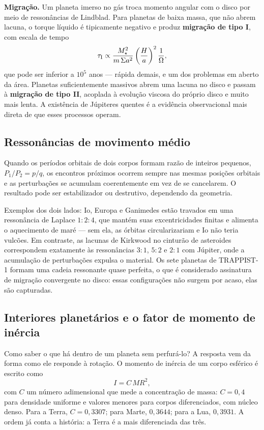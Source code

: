\documentclass[11pt,a4paper]{article}
\begin{document}
\textbf{Migração.} Um planeta imerso no gás troca momento angular com o disco por meio de ressonâncias de Lindblad. Para planetas de baixa massa, que não abrem lacuna, o torque líquido é tipicamente negativo e produz \textbf{migração de tipo I}, com escala de tempo
\[
\tau_{\rm I}\propto\frac{M_\star^{2}}{m\,\Sigma a^{2}}\left(\frac{H}{a}\right)^{2}\frac{1}{\Omega},
\]
que pode ser inferior a $10^{5}$ anos --- rápida demais, e um dos problemas em aberto da área. Planetas suficientemente massivos abrem uma lacuna no disco e passam à \textbf{migração de tipo II}, acoplada à evolução viscosa do próprio disco e muito mais lenta. A existência de Júpiteres quentes é a evidência observacional mais direta de que esses processos operam.

\subsection*{Ressonâncias de movimento médio}

Quando os períodos orbitais de dois corpos formam razão de inteiros pequenos, $P_1/P_2=p/q$, os encontros próximos ocorrem sempre nas mesmas posições orbitais e as perturbações se acumulam coerentemente em vez de se cancelarem. O resultado pode ser estabilizador ou destrutivo, dependendo da geometria.

Exemplos dos dois lados: Io, Europa e Ganimedes estão travados em uma ressonância de Laplace $1:2:4$, que mantém suas excentricidades finitas e alimenta o aquecimento de maré --- sem ela, as órbitas circularizariam e Io não teria vulcões. Em contraste, as lacunas de Kirkwood no cinturão de asteroides correspondem exatamente às ressonâncias $3:1$, $5:2$ e $2:1$ com Júpiter, onde a acumulação de perturbações expulsa o material. Os sete planetas de TRAPPIST-1 formam uma cadeia ressonante quase perfeita, o que é considerado assinatura de migração convergente no disco: essas configurações não surgem por acaso, elas são capturadas.

\subsection*{Interiores planetários e o fator de momento de inércia}

Como saber o que há dentro de um planeta sem perfurá-lo? A resposta vem da forma como ele responde à rotação. O momento de inércia de um corpo esférico é escrito como
\[
I=C\,M R^{2},
\]
com $C$ um número adimensional que mede a concentração de massa: $C=0{,}4$ para densidade uniforme e valores menores para corpos diferenciados, com núcleo denso. Para a Terra, $C=0{,}3307$; para Marte, $0{,}3644$; para a Lua, $0{,}3931$. A ordem já conta a história: a Terra é a mais diferenciada das três.
\end{document}
